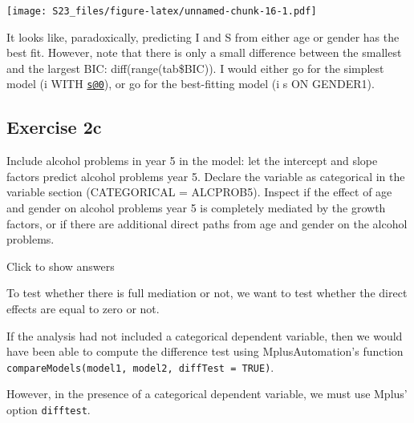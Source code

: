 \documentclass[
]{book}
\newenvironment{Shaded}{\begin{snugshade}}{\end{snugshade}}
\newcommand{\AttributeTok}[1]{\textcolor[rgb]{0.77,0.63,0.00}{#1}}
\newcommand{\CommentTok}[1]{\textcolor[rgb]{0.56,0.35,0.01}{\textit{#1}}}
\newcommand{\DecValTok}[1]{\textcolor[rgb]{0.00,0.00,0.81}{#1}}
\newcommand{\FunctionTok}[1]{\textcolor[rgb]{0.00,0.00,0.00}{#1}}
\newcommand{\NormalTok}[1]{#1}
\newcommand{\SpecialCharTok}[1]{\textcolor[rgb]{0.00,0.00,0.00}{#1}}
\begin{document}
\begin{Shaded}
\end{Shaded}

\texttt{[image: S23\_files/figure-latex/unnamed-chunk-16-1.pdf]}

It looks like, paradoxically, predicting I and S from either age or gender
has the best fit. However, note that there is only a small difference between
the smallest and the largest BIC: diff(range(tab\$BIC)).
I would either go for the simplest model (i WITH \href{mailto:s@0}{\nolinkurl{s@0}}), or go for the
best-fitting model (i s ON GENDER1).

\hypertarget{exercise-2c}{%
\subsection{Exercise 2c}\label{exercise-2c}}

Include alcohol problems in year 5 in the model: let the intercept and slope factors predict alcohol problems year 5. Declare the variable as categorical in the variable section (CATEGORICAL = ALCPROB5).
Inspect if the effect of age and gender on alcohol problems year 5 is completely mediated by the growth
factors, or if there are additional direct paths from age and gender on the alcohol problems.

Click to show answers

To test whether there is full mediation or not, we want to test whether the direct
effects are equal to zero or not.

If the analysis had not included a categorical dependent variable,
then we would have been able to compute the difference test using MplusAutomation's
function \texttt{compareModels(model1,\ model2,\ diffTest\ =\ TRUE)}.

However, in the presence of a categorical dependent variable, we must use Mplus'
option \texttt{difftest}.
\end{document}
